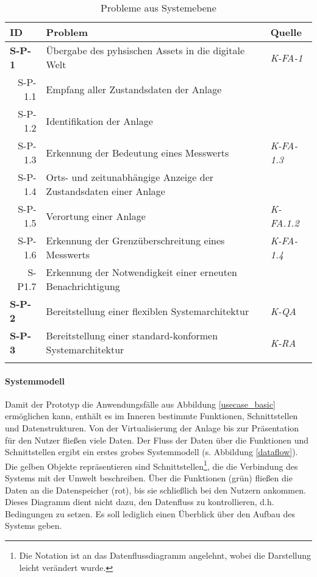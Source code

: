 \begin{table}[ht!]
  \begin{tabularx}{\textwidth}{@{}lXp{2cm}@{}}
      \toprule
      ID                & Problem & Quelle \\
      \midrule
      \textbf{S-P-1}              &       Übergabe des pyhsischen Assets in die digitale Welt               & \textit{K-FA-1}                \\
      \multicolumn{1}{r}{S-P-1.1} &  Empfang aller Zustandsdaten der Anlage     \\
      \multicolumn{1}{r}{S-P-1.2} &  Identifikation der Anlage     \\
      \multicolumn{1}{r}{S-P-1.3} &  Erkennung der Bedeutung eines Messwerts  & \textit{K-FA-1.3}\\
      \multicolumn{1}{r}{S-P-1.4} &  Orts- und zeitunabhängige Anzeige der Zustandsdaten einer Anlage     \\
      \multicolumn{1}{r}{S-P-1.5} &  Verortung einer Anlage & \textit{K-FA.1.2}\\
      \multicolumn{1}{r}{S-P-1.6} &  Erkennung der Grenzüberschreitung eines Messwerts & \textit{K-FA-1.4}\\
      \multicolumn{1}{r}{S-P1.7} &  Erkennung der Notwendigkeit einer erneuten Benachrichtigung\\
      \textbf{S-P-2}              &  Bereitstellung einer flexiblen Systemarchitektur  & \textit{K-QA} \\
      \textbf{S-P-3}              &  Bereitstellung einer standard-konformen Systemarchitektur & \textit{K-RA} \\
      \addlinespace
      \bottomrule
  \end{tabularx}
  \label{system_probleme}
  \caption{Probleme aus Systemebene}

\end{table}


\paragraph{Systemmodell}

Damit der Prototyp die Anwendungsfälle aus Abbildung \ref{usecase_basic} ermöglichen kann, enthält es im Inneren bestimmte Funktionen, Schnittstellen und Datenstrukturen. Von der Virtualisierung der Anlage bis zur Präsentation für den Nutzer fließen viele Daten. Der Fluss der Daten über die Funktionen und Schnittstellen ergibt ein erstes grobes Systemmodell (s. Abbildung \ref{dataflow}). Die gelben Objekte repräsentieren sind Schnittstellen\footnote{Die Notation ist an das Datenflussdiagramm angelehnt, wobei die Darstellung leicht verändert wurde.}, die die Verbindung des Systems mit der Umwelt beschreiben. Über die Funktionen (grün) fließen die Daten an die Datenspeicher (rot), bis sie schließlich bei den Nutzern ankommen. Dieses Diagramm dient nicht dazu, den Datenfluss zu kontrollieren, d.h. Bedingungen zu setzen. Es soll lediglich einen Überblick über den Aufbau des Systems geben.


